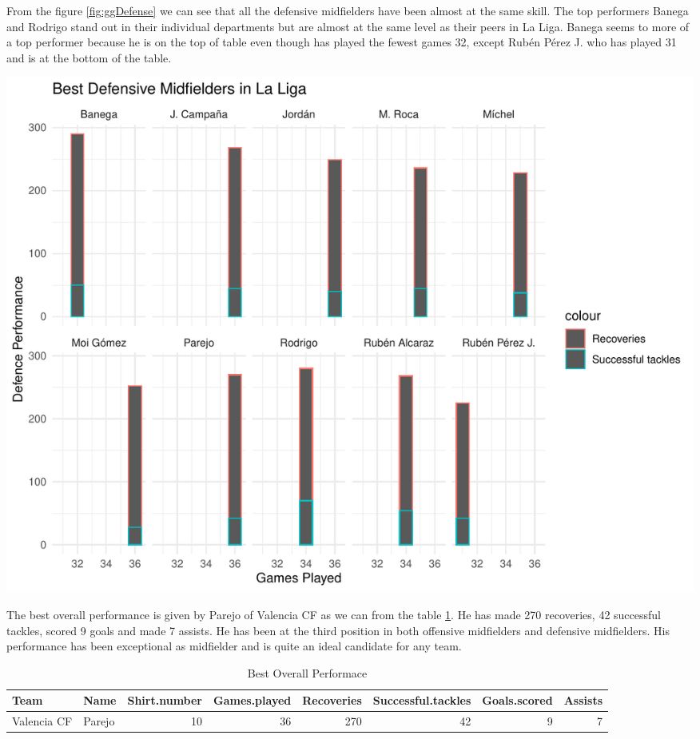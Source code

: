 \documentclass[11pt,a4paper,]{article}
\let\origfigure\figure
\let\endorigfigure\endfigure
\renewenvironment{figure}[1][2] {
    \expandafter\origfigure\expandafter[H]
} {
    \endorigfigure
}
\begin{document}
From the figure \ref{fig:ggDefense} we can see that all the defensive midfielders have been almost at the same skill. The top performers Banega and Rodrigo stand out in their individual departments but are almost at the same level as their peers in La Liga. Banega seems to more of a top performer because he is on the top of table even though has played the fewest games 32, except Rubén Pérez J. who has played 31 and is at the bottom of the table.

\begin{figure}[H]

{\centering \includegraphics[width=0.8\linewidth]{Assignment-4-ETC5513_files/figure-latex/ggDefense-1} 

}

\caption{Best Defensive Midfielders in La Liga }\label{fig:ggDefense}
\end{figure}

The best overall performance is given by Parejo of Valencia CF as we can from the table \ref{tab:best}. He has made 270 recoveries, 42 successful tackles, scored 9 goals and made 7 assists. He has been at the third position in both offensive midfielders and defensive midfielders. His performance has been exceptional as midfielder and is quite an ideal candidate for any team.

\begin{table}[H]

\caption{\label{tab:best}Best Overall Performace}
\centering
\begin{tabular}[t]{l|l|r|r|r|r|r|r}
\hline
Team & Name & Shirt.number & Games.played & Recoveries & Successful.tackles & Goals.scored & Assists\\
\hline
Valencia CF & Parejo & 10 & 36 & 270 & 42 & 9 & 7\\
\hline
\end{tabular}
\end{table}
\end{document}

